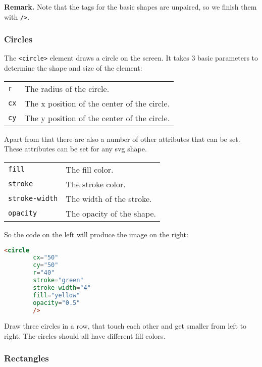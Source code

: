 \documentclass[english,11pt,a4paper]{report}
\begin{document}
{\bf Remark.} Note that the tags for the basic shapes are unpaired, so we finish them with \verb|/>|.


\newpage

\subsubsection{Circles}
The \verb|<circle>| element draws a circle on the screen. It takes 3 basic parameters to determine the shape and size of the element:
\begin{center}
\begin{tabular}{l|p{15cm}}
\verb|r| & The radius of the circle. \\
\verb|cx| & The x position of the center of the circle. \\
\verb|cy| & The y position of the center of the circle. 
\end{tabular}
\end{center}
Apart from that there are also a number of other attributes that can be set. These attributes can be set for any svg shape.
\begin{center}
\begin{tabular}{l|p{15cm}}
\verb|fill| & The fill color. \\
\verb|stroke| & The stroke color. \\
\verb|stroke-width| & The width of the stroke. \\
\verb|opacity| & The opacity of the shape. 
\end{tabular}
\end{center}

So the code on the left will produce the image on the right:
\begin{multicols}{2}
\begin{lstlisting}[language=html]
<circle
        cx="50"
        cy="50"
        r="40"
        stroke="green"
        stroke-width="4"
        fill="yellow"
        opacity="0.5"
        />
\end{lstlisting}
\columnbreak

\end{multicols}

\begin{ex}
Draw three circles in a row, that touch each other and get smaller from left to right. The circles should all have different fill colors.
\end{ex}

\subsubsection{Rectangles} 
 
\end{document}
